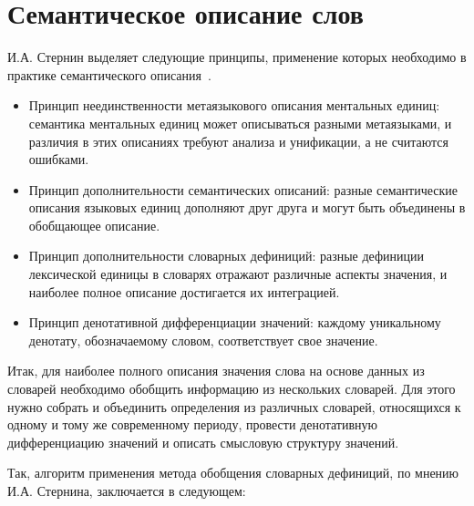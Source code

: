 \documentclass[LI,VKR]{HSEUniversity}
\begin{document}
\section{Семантическое описание слов}

И.А. Стернин выделяет следующие принципы, применение которых необходимо
в практике семантического описания~\cite{SemanticDefinitionsAndAnalysis}.

\begin{itemize}
    \item Принцип неединственности метаязыкового описания ментальных единиц:
семантика ментальных единиц может описываться разными метаязыками,
и различия в этих описаниях требуют анализа и унификации, а не считаются ошибками.
    \item Принцип дополнительности семантических описаний:
разные семантические описания языковых единиц дополняют друг друга и могут быть объединены в обобщающее описание.
    \item Принцип дополнительности словарных дефиниций:
разные дефиниции лексической единицы в словарях отражают различные аспекты значения,
и наиболее полное описание достигается их интеграцией.
    \item Принцип денотативной дифференциации значений:
каждому уникальному денотату, обозначаемому словом, соответствует свое значение.
\end{itemize}

Итак, для наиболее полного описания значения слова на основе данных из словарей
необходимо обобщить информацию из нескольких словарей.
Для этого нужно собрать и объединить определения из различных словарей,
относящихся к одному и тому же современному периоду, провести денотативную дифференциацию значений
и описать смысловую структуру значений.

Так, алгоритм применения метода обобщения словарных дефиниций, по мнению И.А. Стернина, заключается
в следующем:
\end{document}
